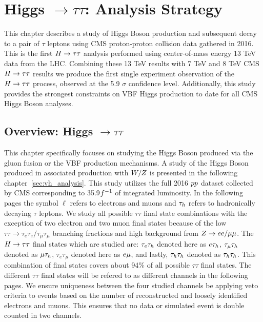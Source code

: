 \chapter{Higgs $\to \tau\tau$: Analysis Strategy}

This chapter describes a study of Higgs Boson production and subsequent
decay to a pair of $\tau$ leptons using CMS proton-proton collision data gathered in 2016.  This is the first
$H\to\tau\tau$ analysis performed using center-of-mass energy 13 TeV data from the LHC. Combining
these 13 TeV results with 7 TeV and 8 TeV CMS $H\to\tau\tau$ results we produce
the first single experiment observation of the $H\to\tau\tau$ process, observed at the 5.9 $\sigma$
confidence level.  Additionally, this study provides the strongest constraints on VBF Higgs 
production to date for all CMS Higgs Boson analyses.

\section{Overview: Higgs $\to \tau\tau$}

This chapter specifically focuses on studying the Higgs Boson produced via the gluon fusion
or the VBF production mechanisms.  A study of the Higgs Boson produced in associated production with
$W/Z$ is presented in the following chapter~\ref{sec:vh_analysis}. This study utilizes the
full 2016 $pp$ dataset collected by CMS corresponding to 35.9$f^{-1}$ of integrated luminosity.
In the following pages the symbol $\ell$ refers to electrons and muons and $\tau_{h}$ refers to hadronically
decaying $\tau$ leptons.  We study all possible $\tau\tau$ final state combinations with the
exception of two electron and two muon final states because of the low 
$\tau\tau \to \tau_{e}\tau_{e}/\tau_{\mu}\tau_{\mu}$
branching fractions and high background from $Z \to ee/\mu\mu$.  The $H\to\tau\tau$ final states which are
studied are: $\tau_{e}\tau_{h}$ denoted here as $e\tau_{h}$, $\tau_{\mu}\tau_{h}$ denoted as $\mu\tau_{h}$,
$\tau_{e}\tau_{\mu}$ denoted here as $e\mu$, and lastly, $\tau_{h}\tau_{h}$ denoted as $\tau_{h}\tau_{h}$.
This combination of final states covers about 94\% of all possible $\tau\tau$ final states.
The different $\tau\tau$ final states will be refered to as different channels in the following pages.
We ensure uniqueness between the four studied channels be applying veto criteria to events based
on the number of reconstructed and loosely identified electrons and muons.  This ensures that 
no data or simulated event is double counted in two channels.

